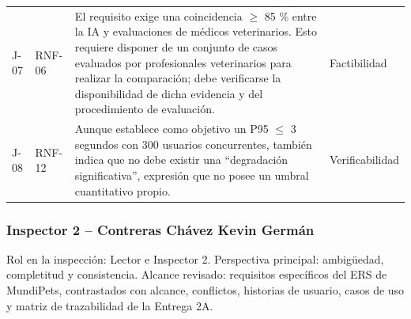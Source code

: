 \documentclass[journal,onecolumn]{IEEEtran}
\begin{document}
\begin{longtable}{C{1.0cm} L{1.7cm} L{6.3cm} L{2.0cm}}
		\addlinespace
		J-07 & RNF-06 &
		El requisito exige una coincidencia $\geq$ 85 \% entre la IA y evaluaciones de médicos
		veterinarios. Esto requiere disponer de un conjunto de casos evaluados por profesionales
		veterinarios para realizar la comparación; debe verificarse la disponibilidad de dicha
		evidencia y del procedimiento de evaluación. & Factibilidad \\
		\addlinespace
		J-08 & RNF-12 &
		Aunque establece como objetivo un P95 $\leq$ 3 segundos con 300 usuarios concurrentes, también
		indica que no debe existir una ``degradación significativa'', expresión que no posee un umbral
		cuantitativo propio. & Verificabilidad \\
	\end{longtable}
	
	\subsubsection{Inspector 2 -- Contreras Chávez Kevin Germán}
	
	Rol en la inspección: Lector e Inspector 2. Perspectiva principal: ambigüedad, completitud y
	consistencia. Alcance revisado: requisitos específicos del ERS de MundiPets, contrastados con
	alcance, conflictos, historias de usuario, casos de uso y matriz de trazabilidad de la Entrega 2A.
	
\end{document}
